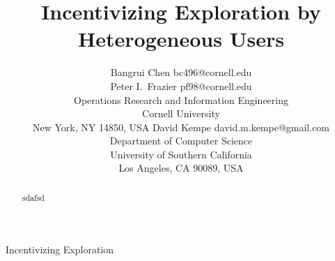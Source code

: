 \documentclass[twoside,11pt]{article}
\begin{document}
\title{Incentivizing Exploration by Heterogeneous Users}

\author{\name Bangrui Chen \email bc496@cornell.edu \\
\name Peter I.\ Frazier \email pf98@cornell.edu \\
\addr Operations Research and Information Engineering\\
Cornell University\\
New York, NY 14850, USA
\AND
\name David Kempe \email david.m.kempe@gmail.com  \\
\addr Department of Computer Science\\
University of Southern California\\
Los Angeles, CA 90089, USA}

\editor{}

\maketitle

\begin{abstract}
sdafsd
\end{abstract}

\begin{keywords}
Incentivizing Exploration
\end{keywords}

     
















\newpage

\appendix




\end{document}
